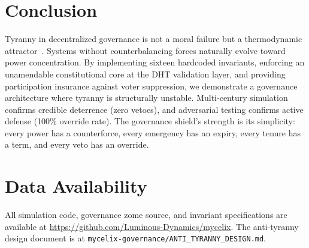 \documentclass[11pt,a4paper]{article}
\begin{document}
\section{Conclusion}
\label{sec:conclusion}

Tyranny in decentralized governance is not a moral failure but a thermodynamic attractor~\cite{delanda}. Systems without counterbalancing forces naturally evolve toward power concentration. By implementing sixteen hardcoded invariants, enforcing an unamendable constitutional core at the DHT validation layer, and providing participation insurance against voter suppression, we demonstrate a governance architecture where tyranny is structurally unstable. Multi-century simulation confirms credible deterrence (zero vetoes), and adversarial testing confirms active defense (100\% override rate). The governance shield's strength is its simplicity: every power has a counterforce, every emergency has an expiry, every tenure has a term, and every veto has an override.

\section*{Data Availability}

All simulation code, governance zome source, and invariant specifications are available at \url{https://github.com/Luminous-Dynamics/mycelix}. The anti-tyranny design document is at \texttt{mycelix-governance/ANTI\_TYRANNY\_DESIGN.md}.
\end{document}
